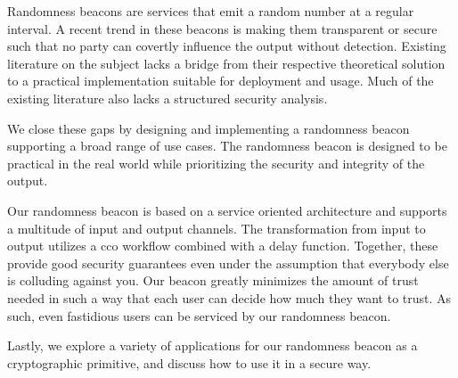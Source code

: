 Randomness beacons are services that emit a random number at a regular interval.
A recent trend in these beacons is making them transparent or secure such that no party can covertly influence the output without detection.
Existing literature on the subject lacks a bridge from their respective theoretical solution to a practical implementation suitable for deployment and usage.
Much of the existing literature also lacks a structured security analysis.

We close these gaps by designing and implementing a randomness beacon supporting a broad range of use cases.
The randomness beacon is designed to be practical in the real world while prioritizing the security and integrity of the output.

Our randomness beacon is based on a service oriented architecture and supports a multitude of input and output channels.
The transformation from input to output utilizes a \gls{cco} workflow combined with a delay function.
Together, these provide good security guarantees even under the assumption that everybody else is colluding against you.
Our beacon greatly minimizes the amount of trust needed in such a way that each user can decide how much they want to trust.
As such, even fastidious users can be serviced by our randomness beacon.

Lastly, we explore a variety of applications for our randomness beacon as a cryptographic primitive, and discuss how to use it in a secure way.

\glsresetall

